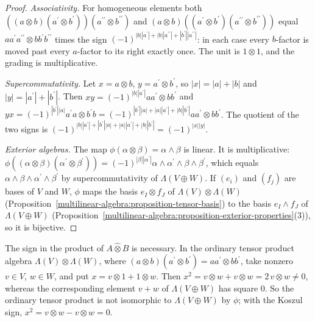 \begin{proof}
\emph{Associativity.} For homogeneous elements both $((a \otimes b)(a^{\prime} \otimes b^{\prime}))(a^{\prime\prime} \otimes b^{\prime\prime})$ and $(a \otimes b)((a^{\prime} \otimes b^{\prime})(a^{\prime\prime} \otimes b^{\prime\prime}))$ equal
$aa^{\prime}a^{\prime\prime} \otimes bb^{\prime}b^{\prime\prime}$ times the sign $(-1)^{|b||a^{\prime}| + |b||a^{\prime\prime}| + |b^{\prime}||a^{\prime\prime}|}$: in each case every $b$-factor is moved past every $a$-factor to its right exactly once.
The unit is $1 \otimes 1$, and the grading is multiplicative.

\emph{Supercommutativity.} Let $x = a \otimes b$, $y = a^{\prime} \otimes b^{\prime}$, so $|x| = |a| + |b|$ and $|y| = |a^{\prime}| + |b^{\prime}|$. Then $xy = (-1)^{|b||a^{\prime}|}aa^{\prime} \otimes bb^{\prime}$ and
$yx = (-1)^{|b^{\prime}||a|}a^{\prime}a \otimes b^{\prime}b = (-1)^{|b^{\prime}||a| + |a||a^{\prime}| + |b||b^{\prime}|}aa^{\prime} \otimes bb^{\prime}$. The quotient of the two signs is $(-1)^{|b||a^{\prime}| + |b^{\prime}||a| + |a||a^{\prime}| + |b||b^{\prime}|} = (-1)^{|x||y|}$.

\emph{Exterior algebras.} The map $\phi(\alpha \otimes \beta) = \alpha \wedge \beta$ is linear. It is multiplicative: $\phi((\alpha \otimes \beta)(\alpha^{\prime} \otimes \beta^{\prime})) = (-1)^{|\beta||\alpha^{\prime}|}\alpha \wedge \alpha^{\prime} \wedge \beta \wedge \beta^{\prime}$, which equals
$\alpha \wedge \beta \wedge \alpha^{\prime} \wedge \beta^{\prime}$ by supercommutativity of $\Lambda(V \oplus W)$. If $(e_i)$ and $(f_j)$ are bases of $V$ and $W$, $\phi$ maps the basis $e_I \otimes f_J$ of $\Lambda(V) \otimes \Lambda(W)$
(Proposition~\ref{multilinear-algebra:proposition-tensor-basis}) to the basis $e_I \wedge f_J$ of $\Lambda(V \oplus W)$ (Proposition~\ref{multilinear-algebra:proposition-exterior-properties}(3)), so it is bijective.
\end{proof}

\begin{counterexample}\label{multilinear-algebra:counterexample-unsigned-tensor}
The sign in the product of $A \hat\otimes B$ is necessary. In the ordinary tensor product algebra $\Lambda(V) \otimes \Lambda(W)$, where $(a \otimes b)(a^{\prime} \otimes b^{\prime}) = aa^{\prime} \otimes bb^{\prime}$, take nonzero $v \in V$,
$w \in W$, and put $x = v \otimes 1 + 1 \otimes w$. Then $x^2 = v \otimes w + v \otimes w = 2\,v \otimes w \neq 0$, whereas the corresponding element $v + w$ of $\Lambda(V \oplus W)$ has square $0$. So the ordinary
tensor product is not isomorphic to $\Lambda(V \oplus W)$ by $\phi$; with the Koszul sign, $x^2 = v \otimes w - v \otimes w = 0$.
\end{counterexample}

